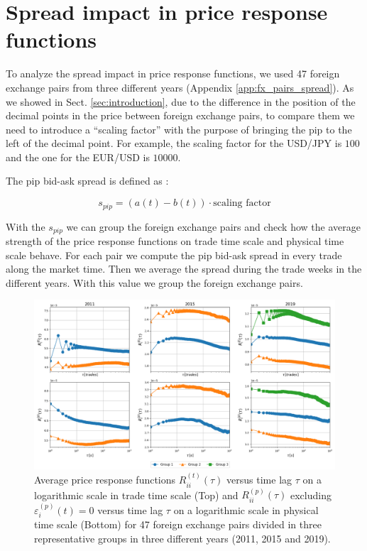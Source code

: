 \section{Spread impact in price response functions}\label{sec:spread_impact}

To analyze the spread impact in price response functions, we used 47 foreign
exchange pairs from three different years (Appendix \ref{app:fx_pairs_spread}).
As we showed in Sect. \ref{sec:introduction}, due to the difference in the
position of the decimal points in the price between foreign exchange pairs, to
compare them we need to introduce a ``scaling factor'' with the purpose of
bringing the pip to the left of the decimal point. For example, the scaling
factor for the USD/JPY is $100$ and the one for the EUR/USD is $10000$.

The pip bid-ask spread is defined as \cite{micro_eff}:

\begin{equation}
    s_{pip} = \left(a\left(t\right) - b\left(t\right)\right) \cdot
    \text{scaling factor}
\end{equation}

With the $s_{pip}$ we can group the foreign exchange pairs and check how the
average strength of the price response functions on trade time scale and
physical time scale behave. For each pair we compute the pip bid-ask spread in
every trade along the market time. Then we average the spread during the trade
weeks in the different years. With this value we group the foreign exchange
pairs.

\begin{figure}[htbp]
    \centering
    \includegraphics[width=\textwidth]{figures/05_spread_impact.png}
    \caption{Average price response functions
             $R^{\left(t\right)}_{ii}\left(\tau\right)$ versus time lag $\tau$
             on a logarithmic scale in trade time scale (Top) and
             $R^{\left(p\right)}_{ii}\left(\tau\right)$ excluding
             $\varepsilon^{\left(p\right)}_{i}\left(t\right) = 0$ versus time
             lag $\tau$ on a logarithmic scale in physical time scale (Bottom)
             for 47 foreign exchange pairs divided in three representative
             groups in three different years (2011, 2015 and 2019).}
    \label{fig:spread_impact}
\end{figure}

